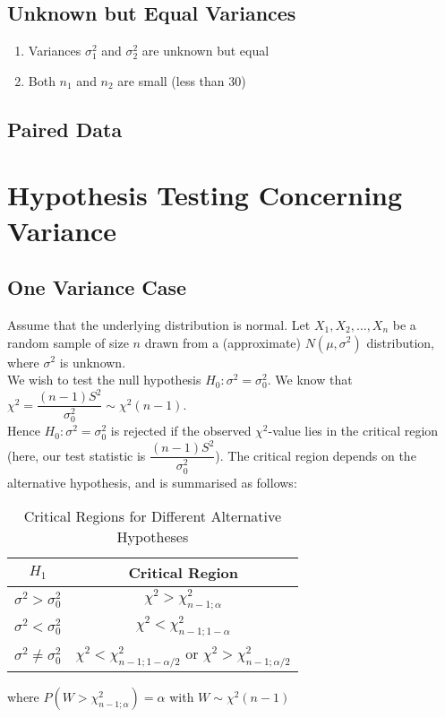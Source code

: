 \subsection{Unknown but Equal Variances}
\begin{enumerate}
    \item Variances $\sigma_1^2$ and $\sigma_2^2$ are unknown but equal
     \item Both $n_1$ and $n_2$ are small (less than 30)
\end{enumerate}
\subsection{Paired Data}
\section{Hypothesis Testing Concerning Variance}
\subsection{One Variance Case}
Assume that the underlying distribution is normal. Let $X_1, X_2, \dots, X_n$ be a random sample of size $n$ drawn from a (approximate) $N(\mu, \sigma^2)$ distribution, where $\sigma^2$ is unknown. \\
We wish to test the null hypothesis $H_0: \sigma^2 = \sigma_0^2$. We know that $\chi^2 = \dfrac{(n - 1)S^2}{\sigma_0^2} \sim \chi^2(n-1)$. \\
Hence $H_0: \sigma^2 = \sigma_0^2$ is rejected if the observed $\chi^2$-value lies in the critical region (here, our test statistic is $\dfrac{(n - 1)S^2}{\sigma_0^2}$). The critical region depends on the alternative hypothesis, and is summarised as follows:
\renewcommand{\arraystretch}{1.5}
\begin{table}[h]
    \centering
    \begin{tabular}{|c|c|}
    \hline
      \textbf{$H_1$}   &  \textbf{Critical Region} \\
      \hline
        $\sigma^2 > \sigma_0^2$ & $\chi^2 > \chi_{n - 1; \alpha}^2$ \\
      \hline
        $\sigma^2 < \sigma_0^2$ &  $\chi^2 < \chi_{n - 1; 1- \alpha}^2$\\
      \hline
        $\sigma^2 \neq \sigma_0^2$ & $\chi^2 < \chi_{n - 1; 1- \alpha/2}^2$ or $\chi^2 > \chi_{n - 1; \alpha/2}^2$ \\
      \hline
    \end{tabular}
    \caption{Critical Regions for Different Alternative Hypotheses}
    \label{tab:my_label}
\end{table}
where $P(W > \chi_{n - 1; \alpha}^2) = \alpha$ with $W \sim \chi^2(n-1)$
